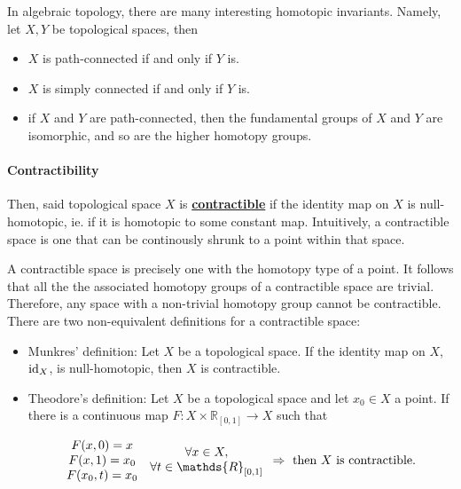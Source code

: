 In algebraic topology, there are many interesting homotopic invariants. Namely, let $X, Y$ be topological spaces, then 

\begin{itemize}
    \item $X$ is path-connected if and only if $Y$ is.
    \item $X$ is simply connected if and only if $Y$ is.
    \item if $X$ and $Y$ are path-connected, then the fundamental groups of $X$ and $Y$ are isomorphic, and so are the higher homotopy groups. \\
\end{itemize}

\paragraph{\textbf{Contractibility}}

 Then, said topological space $X$ is \underline{\textbf{contractible}} if the identity map on $X$ is null-homotopic, ie. if it is homotopic to some constant map. Intuitively, a contractible space is one that can be continously shrunk to a point within that space.

A contractible space is precisely one with the homotopy type of a point. It follows that all the the associated homotopy groups of a contractible space are trivial. Therefore, any space with a non-trivial homotopy group cannot be contractible. There are two non-equivalent definitions for a contractible space:

\begin{itemize}
    \item Munkres' definition: Let $X$ be a topological space. If the identity map on $X$, $\textnormal{id}_X$, is null-homotopic, then $X$ is contractible. 
    \item Theodore's definition: Let $X$ be a topological space and let $x_0 \in X$ a point. If there is a continuous map $F: X \times \mathds{R}_{[0,1]} \rightarrow X$ such that 
    
    \begin{align}
    \begin{array}{c}
         F(x, 0) = x \\
         F(x, 1) = x_0 \\
         F(x_0, t) = x_0  
    \end{array} \begin{array}{c}
        \forall x \in X, \\
        \forall t \in \mathds{R}_{[0,1]}
    \end{array} 
    \Rightarrow \textnormal{ then $X$ is contractible. }
    \end{align}
\end{itemize}

